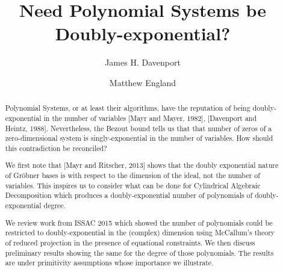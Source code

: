\documentclass{llncs}
\begin{document}
\title{Need Polynomial Systems be Doubly-exponential?}


\author{James H. Davenport \and Matthew England }

\maketitle              

\begin{abstract}
Polynomial Systems, or at least their algorithms, have the reputation of being doubly-exponential in the number of variables [Mayr and Mayer, 1982], [Davenport and Heintz, 1988]. Nevertheless, the Bezout bound tells us that that number of zeros of a zero-dimensional system is singly-exponential in the number of variables. How should this contradiction be reconciled?

We first note that [Mayr and Ritscher, 2013] shows that the doubly exponential nature of Gr\"{o}bner bases is with respect to the dimension of the ideal, not the number of variables.  This inspires us to consider what can be done for Cylindrical Algebraic Decomposition which produces a doubly-exponential number of polynomials of doubly-exponential degree. 

We review work from ISSAC 2015 which showed the number of polynomials could be restricted to doubly-exponential in the (complex) dimension using McCallum's theory of reduced projection in the presence of equational constraints.  We then discuss preliminary results showing the same for the degree of those polynomials.  The results are under primitivity assumptions whose importance we illustrate.

\end{abstract}
\end{document}
